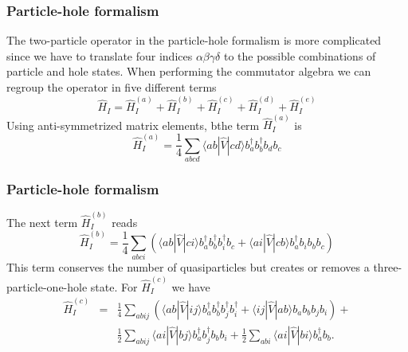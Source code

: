 \documentclass{beamer}
\begin{document}
\begin{frame}
\frametitle{Particle-hole formalism}

\begin{block}{}
The two-particle operator in the particle-hole formalism  is more complicated since we have
to translate four indices $\alpha\beta\gamma\delta$ to the possible combinations of particle and hole
states.  When performing the commutator algebra we can regroup the operator in five different terms
\begin{equation}
	\hat{H}_I = \hat{H}_I^{(a)} + \hat{H}_I^{(b)} + \hat{H}_I^{(c)} + \hat{H}_I^{(d)} + \hat{H}_I^{(e)} \label{eq:2-65}
\end{equation}
Using anti-symmetrized  matrix elements, 
bthe term  $\hat{H}_I^{(a)}$ is  
\begin{equation}
	\hat{H}_I^{(a)} = \frac{1}{4}
	\sum_{abcd} \langle ab|\hat{V}|cd\rangle 
		b_a^\dagger b_b^\dagger b_d b_c \label{eq:2-66}
\end{equation}
\end{block}
\end{frame}

\begin{frame}
\frametitle{Particle-hole formalism}

\begin{block}{}
The next term $\hat{H}_I^{(b)}$  reads
\begin{equation}
	 \hat{H}_I^{(b)} = \frac{1}{4} \sum_{abci}\left(\langle ab|\hat{V}|ci\rangle b_a^\dagger b_b^\dagger b_i^\dagger b_c +\langle ai|\hat{V}|cb\rangle b_a^\dagger b_i b_b b_c\right) \label{eq:2-67b}
\end{equation}
This term conserves the number of quasiparticles but creates or removes a 
three-particle-one-hole  state. 
For $\hat{H}_I^{(c)}$  we have
\begin{eqnarray}
	\hat{H}_I^{(c)}& =& \frac{1}{4}
		\sum_{abij}\left(\langle ab|\hat{V}|ij\rangle b_a^\dagger b_b^\dagger b_j^\dagger b_i^\dagger +
		\langle ij|\hat{V}|ab\rangle b_a  b_b b_j b_i \right)+  \nonumber \\
	&&	\frac{1}{2}\sum_{abij}\langle ai|\hat{V}|bj\rangle b_a^\dagger b_j^\dagger b_b b_i + 
		\frac{1}{2}\sum_{abi}\langle ai|\hat{V}|bi\rangle b_a^\dagger b_b. \label{eq:2-68c}
\end{eqnarray}
\end{block}
\end{frame}
\end{document}
